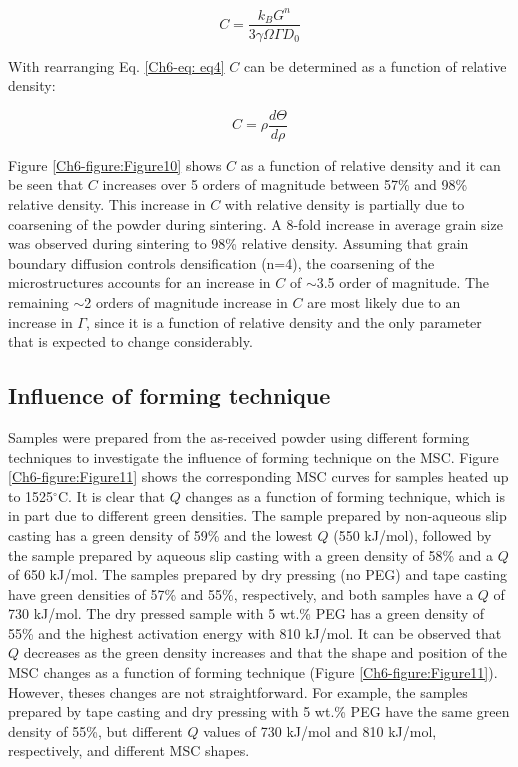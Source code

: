 \begin{equation}
\label{Ch6-eq: eq7}
C = \frac{k_{B} G^{n}}{3 \gamma \Omega \Gamma D_{0}} 
\end{equation}

\noindent With rearranging Eq. \ref{Ch6-eq: eq4} $C$ can be determined as a function of relative density:

\begin{equation}
\label{Ch6-eq: eq8}
C = \rho \frac{d\Theta}{d \rho} 
\end{equation}

\noindent Figure \ref{Ch6-figure:Figure10} shows $C$ as a function of relative density and it can be seen that $C$ increases over 5 orders of magnitude between 57\% and 98\% relative density. This increase in $C$ with relative density is partially due to coarsening of the powder during sintering. A 8-fold increase in average grain size was observed during sintering to 98\% relative density. Assuming that grain boundary diffusion controls densification (n=4), the coarsening of the microstructures accounts for an increase in $C$ of $\sim$3.5 order of magnitude. The remaining $\sim$2 orders of magnitude increase in $C$ are most likely due to an increase in $\Gamma$, since it is a function of relative density and the only parameter that is expected to change considerably.
		
\subsection{Influence of forming technique}
Samples were prepared from the as-received powder using different forming techniques to investigate the influence of forming technique on the MSC. Figure \ref{Ch6-figure:Figure11} shows the corresponding MSC curves for samples heated up to 1525$^{\circ}$C. It is clear that $Q$ changes as a function of forming technique, which is in part due to different green densities. The sample prepared by non-aqueous slip casting has a green density of 59\% and the lowest $Q$ (550 kJ/mol), followed by the sample prepared by aqueous slip casting with a green density of 58\% and a $Q$ of 650 kJ/mol. The samples prepared by dry pressing (no PEG) and tape casting have green densities of 57\% and 55\%, respectively, and both samples have a $Q$ of 730 kJ/mol. The dry pressed sample with 5 wt.\% PEG has a green density of 55\% and the highest activation energy with 810 kJ/mol. It can be observed that $Q$ decreases as the green density increases and that the shape and position of the MSC changes as a function of forming technique (Figure \ref{Ch6-figure:Figure11}). However, theses changes are not straightforward. For example, the samples prepared by tape casting and dry pressing with 5 wt.\% PEG have the same green density of 55\%, but different $Q$ values of 730 kJ/mol and 810 kJ/mol, respectively, and different MSC shapes. 


